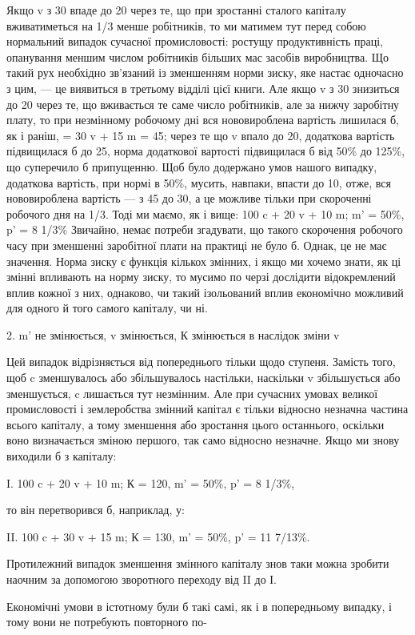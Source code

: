 Якщо v з 30 впаде до 20 через те, що при зростанні сталого
капіталу вживатиметься на 1/3 менше робітників, то ми матимем
тут перед собою нормальний випадок сучасної промисловості:
ростущу продуктивність праці, опанування меншим числом робітників
більших мас засобів виробництва. Що такий рух необхідно
зв'язаний із зменшенням норми зиску, яке настає одночасно
з цим, — це виявиться в третьому відділі цієї книги.
       Але якщо v з 30 знизиться до 20 через те, що вживається
те саме число робітників, але за нижчу заробітну плату, то при
незмінному робочому дні вся нововироблена вартість лишилася
б, як і раніш, = 30 v + 15 m = 45; через те що v впало до 20,
додаткова вартість підвищилася б до 25, норма додаткової
вартості підвищилася б від 50\%  до 125\%, що суперечило б
припущенню. Щоб було додержано умов нашого випадку, додаткова
вартість, при нормі в 50\%, мусить, навпаки, впасти до
10, отже, вся нововироблена вартість — з 45 до 30, а це можливе
тільки при скороченні робочого дня на 1/3. Тоді ми маємо,
як і вище:
                        100 c + 20 v + 10 m; m' = 50\%, p' = 8 1/3\%
      Звичайно, немає потреби згадувати, що такого скорочення
робочого часу при зменшенні заробітної плати на практиці не
було б. Однак, це не має значення. Норма зиску є функція
кількох змінних, і якщо ми хочемо знати, як ці змінні впливають
на норму зиску, то мусимо по черзі дослідити відокремлений
вплив кожної з них, однаково, чи такий ізольований вплив
економічно можливий для одного й того самого капіталу, чи ні.

                       2. m' не  змінюється, v змінюється, К змінюється
                                                    в наслідок зміни v

Цей випадок відрізняється від попереднього тільки щодо
ступеня. Замість того, щоб c зменшувалось або збільшувалось
настільки, наскільки v збільшується або зменшується, c лишається
тут незмінним. Але при сучасних умовах великої промисловості
і землеробства змінний капітал є тільки відносно
незначна частина всього капіталу, а тому зменшення або зростання
цього останнього, оскільки воно визначається зміною
першого, так само відносно незначне. Якщо ми знову виходили
б з капіталу:

I.    100 c + 20 v + 10 m; К = 120, m' = 50\%, p' = 8 1/3\%,

то він перетворився б, наприклад, у:

II.    100 c + 30 v + 15 m; К = 130, m' = 50\%, p' = 11 7/13\%.

Протилежний випадок зменшення змінного капіталу знов
таки можна зробити наочним за допомогою зворотного переходу
від II до І.

Економічні умови в істотному були б такі самі, як і в попередньому
випадку, і тому вони не потребують повторного по-
